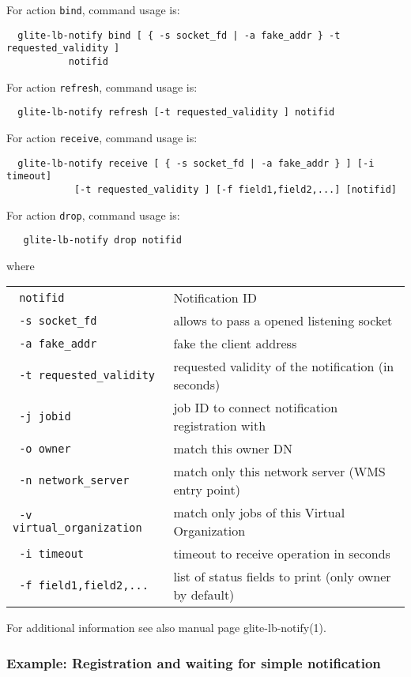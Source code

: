 For action \verb'bind', command usage is:
\begin{verbatim}
  glite-lb-notify bind [ { -s socket_fd | -a fake_addr } -t requested_validity ] 
           notifid
\end{verbatim}

For action \verb'refresh', command usage is:
\begin{verbatim}
  glite-lb-notify refresh [-t requested_validity ] notifid
\end{verbatim}

For action \verb'receive', command usage is:
\begin{verbatim}
  glite-lb-notify receive [ { -s socket_fd | -a fake_addr } ] [-i timeout]
            [-t requested_validity ] [-f field1,field2,...] [notifid]
\end{verbatim}

For action \verb'drop', command usage is:
\begin{verbatim}
   glite-lb-notify drop notifid
\end{verbatim}

where

\begin{tabularx}{\textwidth}{lX}
\texttt{  notifid} & Notification ID \\
\texttt{  -s socket\_fd} &  allows  to  pass  a opened listening socket  \\
\texttt{  -a fake\_addr} &  fake the client address \\
\texttt{  -t requested\_validity} & requested validity of the notification (in seconds)   \\
\texttt{  -j jobid} & job ID to connect notification registration with   \\
\texttt{  -o owner} & match this owner DN   \\
\texttt{  -n network\_server} &  match only this network server (WMS entry point)  \\
\texttt{  -v virtual\_organization} & match only jobs of this Virtual Organization  \\
\texttt{  -i timeout} & timeout to receive operation in seconds   \\
\texttt{  -f field1,field2,...} & list of status fields to print (only owner by default)   \\
\end{tabularx}

For additional information see also manual page glite-lb-notify(1).

\subsubsection{Example: Registration and waiting for simple notification}
\label{e:notify}

